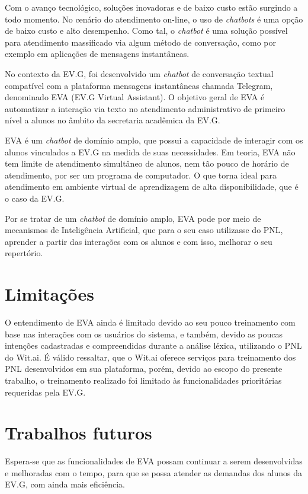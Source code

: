Com o avanço tecnológico, soluções inovadoras e de baixo custo estão surgindo a todo momento. No cenário do atendimento on-line, o uso de \textit{chatbots} é uma opção de baixo custo e alto desempenho. Como tal, o \textit{chatbot} é uma solução possível para atendimento massificado via algum método de conversação, como por exemplo em aplicações de mensagens instantâneas.

No contexto da EV.G, foi desenvolvido um \textit{chatbot} de conversação textual compatível com a plataforma mensagens instantâneas chamada Telegram, denominado EVA (EV.G Virtual Assistant). O objetivo geral de EVA é automatizar a interação via texto no atendimento administrativo de primeiro nível a alunos no âmbito da secretaria acadêmica da EV.G.

EVA é um \textit{chatbot} de domínio amplo, que possui a capacidade de interagir com os alunos vinculados a EV.G na medida de suas necessidades. Em teoria, EVA não tem limite de atendimento simultâneo de alunos, nem tão pouco de horário de atendimento, por ser um programa de computador. O que torna ideal para atendimento em ambiente virtual de aprendizagem de alta disponibilidade, que é o caso da EV.G.

Por se tratar de um \textit{chatbot} de domínio amplo, EVA pode por meio de mecanismos de Inteligência Artificial, que para o seu caso utilizasse do PNL, aprender a partir das interações com os alunos e com isso, melhorar o seu repertório.



\section{Limitações}

O entendimento de EVA ainda é limitado devido ao seu pouco treinamento com base nas interações com os usuários do sistema, e também, devido as poucas intenções cadastradas e compreendidas durante a análise léxica, utilizando o PNL do Wit.ai. É válido ressaltar, que o Wit.ai oferece serviços para treinamento dos PNL desenvolvidos em sua plataforma, porém, devido ao escopo do presente trabalho, o treinamento realizado foi limitado às funcionalidades prioritárias requeridas pela EV.G.



\section{Trabalhos futuros}

Espera-se que as funcionalidades de EVA possam continuar a serem desenvolvidas e melhoradas com o tempo, para que se possa atender as demandas dos alunos da EV.G, com ainda mais eficiência.

